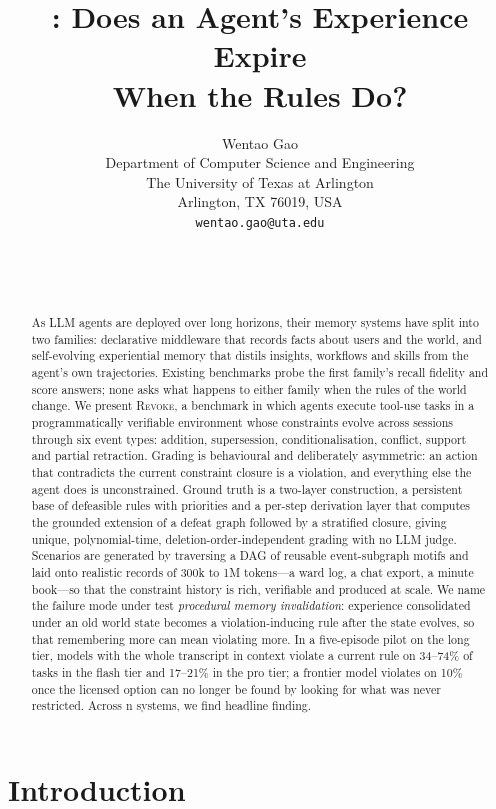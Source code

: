 \documentclass{article} %
\title{\revoke: Does an Agent's Experience Expire\\When the Rules Do?}
\author{Wentao Gao \\
Department of Computer Science and Engineering\\
The University of Texas at Arlington\\
Arlington, TX 76019, USA \\
\texttt{wentao.gao@uta.edu} \\
\And
\ph{co-authors} \\
\ph{affiliation} \\
\ph{address} \\
\texttt{\ph{email}}
}
\newcommand{\ph}[1]{#1}
\newcommand{\ph}[1]{\colorbox{phbg}{\textcolor{phfg}{\small\texttt{#1}}}}
\newcommand{\revoke}{\textsc{Revoke}}
\begin{document}
\maketitle

\begin{abstract}
As LLM agents are deployed over long horizons, their memory systems have split into two families: declarative middleware that records facts about users and the world, and self-evolving experiential memory that distils insights, workflows and skills from the agent's own trajectories. Existing benchmarks probe the first family's recall fidelity and score answers; none asks what happens to either family when the rules of the world change. We present \revoke, a benchmark in which agents execute tool-use tasks in a programmatically verifiable environment whose constraints evolve across sessions through six event types: addition, supersession, conditionalisation, conflict, support and partial retraction. Grading is behavioural and deliberately asymmetric: an action that contradicts the current constraint closure is a violation, and everything else the agent does is unconstrained. Ground truth is a two-layer construction, a persistent base of defeasible rules with priorities and a per-step derivation layer that computes the grounded extension of a defeat graph followed by a stratified closure, giving unique, polynomial-time, deletion-order-independent grading with no LLM judge. Scenarios are generated by traversing a DAG of reusable event-subgraph motifs and laid onto realistic records of 300k to 1M tokens---a ward log, a chat export, a minute book---so that the constraint history is rich, verifiable and produced at scale. We name the failure mode under test \emph{procedural memory invalidation}: experience consolidated under an old world state becomes a violation-inducing rule after the state evolves, so that remembering more can mean violating more. In a five-episode pilot on the long tier, models with the whole transcript in context violate a current rule on 34--74\% of tasks in the flash tier and 17--21\% in the pro tier; a frontier model violates on 10\% once the licensed option can no longer be found by looking for what was never restricted. Across \ph{n} systems, we find \ph{headline finding}.
\end{abstract}

\section{Introduction}
\end{document}
